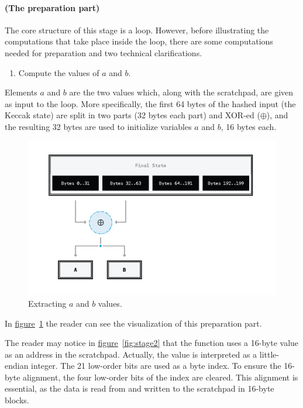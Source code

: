 \paragraph{(The preparation part)} The core structure of this stage is a loop. However, before illustrating the computations that take place inside the loop, there are some computations needed for preparation and two technical clarifications.

\begin{enumerate}
  \item \label{memh: step 1} Compute the values of $a$ and $b$.
\end{enumerate}
Elements $a$ and $b$ are the two values which, along with the scratchpad, are given as input to the loop. More specifically, the first 64 bytes of the hashed input (the Keccak state) are split in two parts (32 bytes each part) and XOR-ed ($\oplus$), and the resulting 32 bytes are used to initialize variables $a$ and $b$, 16 bytes each.

\begin{figure}
  \centering
  \includegraphics[scale=0.62,keepaspectratio]{Images/Bill/input_stage_2_modified.png}
  \caption{Extracting $a$ and $b$ values.~\cite{bill}}
  \label{fig:stage2input}
\end{figure}

In \hyperref[fig:stage2input]{figure}~\ref{fig:stage2input} the reader can see the visualization of this preparation part.
\clearpage

\begin{tcolorbox}[colback=yellow!5!white,colframe=yellow!65!black,title=\emph{Clarification 1:}]
  The reader may notice in \hyperref[fig:stage2]{figure}~\ref{fig:stage2} that the function uses a 16-byte value as an address in the scratchpad. Actually, the value is interpreted as a little-endian integer. The 21 low-order bits are used as a byte index. To ensure the 16-byte alignment, the four low-order bits of the index are cleared. This alignment is essential, as the data is read from and written to the scratchpad in 16-byte blocks.
\end{tcolorbox}
\vspace{0.2cm}

